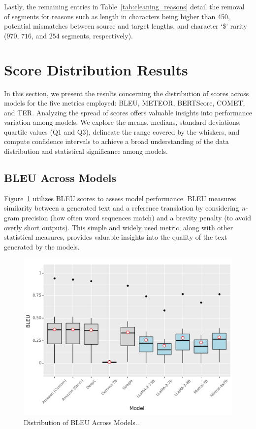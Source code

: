 Lastly, the remaining entries in Table~\ref{tab:cleaning_reasons} detail the removal of segments for reasons such as length in characters being higher than 450, potential mismatches between source and target lengths, and character `\$' rarity ($970$, $716$, and $254$ segments, respectively).


\section{Score Distribution Results}
\label{sec:Distribution}

In this section, we present the results concerning the distribution of scores across models for the five metrics employed: BLEU, METEOR, BERTScore, COMET, and TER. Analyzing the spread of scores offers valuable insights into performance variation among models. We explore the means, medians, standard deviations, quartile values (Q1 and Q3), delineate the range covered by the whiskers, and compute confidence intervals to achieve a broad understanding of the data distribution and statistical significance among models.


\subsection{BLEU Across Models}

Figure~\ref{fig: blue-models} utilizes BLEU scores to assess model performance. BLEU measures similarity between a generated text and a reference translation by considering \emph{n-}gram precision (how often word sequences match) and a brevity penalty (to avoid overly short outputs). This simple and widely used metric, along with other statistical measures, provides valuable insights into the quality of the text generated by the models.

\begin{figure}[htb]
        \centering        \includegraphics[width=.9\textwidth]{textual/Figuras/Results/unknown-37.png}
        \caption{Distribution of BLEU Across Models..}
        \label{fig: blue-models}
\end{figure}


